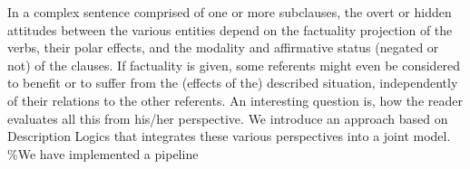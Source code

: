 In a complex sentence comprised of one or more subclauses, the overt or hidden attitudes between the various entities depend on the factuality projection of the verbs, their polar effects, and the modality and affirmative status (negated or not) of the clauses. If factuality is given, some referents might even be considered to benefit or to suffer from the (effects of the) described situation, independently of their relations to the other referents. An interesting question is, how the reader evaluates all this from his/her perspective. We introduce an approach based on Description Logics that integrates these various perspectives into a joint model. \%We have implemented a pipeline
